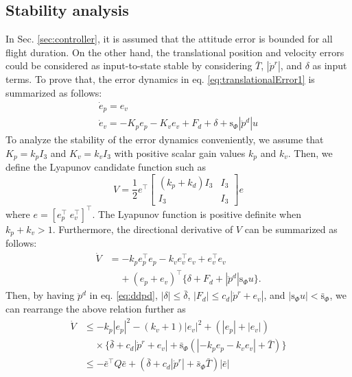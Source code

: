 \documentclass[letterpaper, 10 pt, conference]{ieeeconf}  %
\begin{document}
\subsection{Stability analysis}
In Sec. \ref{sec:controller}, it is assumed that the attitude error is bounded for all flight duration.
On the other hand, the translational position and velocity errors could be considered as input-to-state stable by considering $\bar{T}$, $|\dot{p}^r|$, and $\delta$ as input terms. 
To prove that, the error dynamics in eq. \eqref{eq:translationalError1} is summarized as follows: 
\begin{equation}
\begin{array}{l}
\dot{e}_p = e_v \\
\dot{e}_v = -K_pe_p-K_ve_v+F_d+\delta+\text{s}_\Phi|\ddot{p}^d| u 
\end{array} \label{eq:errorDynamics}
\end{equation}
To analyze the stability of the error dynamics conveniently, we assume that $K_p = k_pI_3$ and $K_v = k_vI_3$ with positive scalar gain values $k_p$ and $k_v$. Then, we define the Lyapunov candidate function such as
\begin{equation}
V = \frac{1}{2} e^\top 
\left[
\begin{array}{rr}
(k_p+k_d)I_3 & I_3 \\ I_3 & I_3
\end{array}
\right]e \nonumber
\end{equation}
where $e = [e_p^\top\;e_v^\top]^\top$. The Lyapunov function is positive definite when $k_p + k_v > 1$.
Furthermore, the directional derivative of $V$ can be summarized as follows:
\begin{align}
\dot{V} &= -k_p e_p^\top e_p -k_v e_v^\top e_v + e_v^\top e_v \nonumber \\
&\;\;\;\;+(e_p+e_v)^\top\{\delta + F_d + |\ddot{p}^d|\text{s}_\Phi u\}.
\end{align}
Then, by having $\ddot{p}^d$ in eq. \eqref{eq:ddpd}, $|\delta|\leq\bar{\delta}$, $|F_d| \leq c_d|\dot{p}^r+e_v|$, and $|\text{s}_\Phi u| < \bar{\text{s}}_\Phi$, we can rearrange the above relation further as
\begin{align}
\dot{V} &\leq -k_p|e_p|^2 -(k_v+1)|e_v|^2 +(|e_p| + |e_v|)\nonumber \\
&\;\;\;\;\times\{\bar{\delta} + c_d|\dot{p}^r+e_v|+\bar{\text{s}}_\Phi(|-k_pe_p-k_ve_v|+\bar{T})\} \nonumber \\
&\leq -\bar{e}^\top Q\bar{e} + (\bar{\delta}+c_d|\dot{p}^r|+\bar{s}_\Phi\bar{T})|\bar{e}| \label{eq:dotV}
\end{align} 
\end{document}
